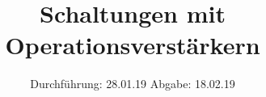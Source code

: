 

\subject{V 51}
\title{Schaltungen mit Operationsverstärkern}
\date{
  Durchführung: 28.01.19
  \hspace{3em}
  Abgabe: 18.02.19
}



\maketitle
\thispagestyle{empty}
\tableofcontents
\newpage






\printbibliography




